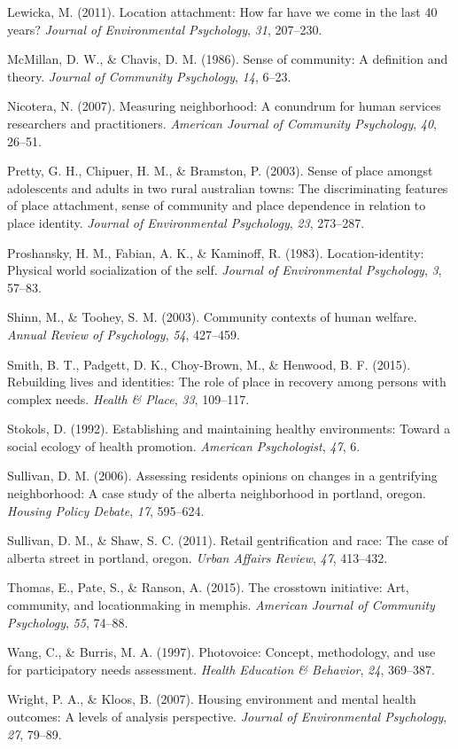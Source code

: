 \documentclass[11pt,]{tufte-handout}
\begin{document}
\hypertarget{ref-lewicka2011place}{}
Lewicka, M. (2011). Location attachment: How far have we come in the
last 40 years? \emph{Journal of Environmental Psychology}, \emph{31},
207--230.

\hypertarget{ref-mcmillan1986sense}{}
McMillan, D. W., \& Chavis, D. M. (1986). Sense of community: A
definition and theory. \emph{Journal of Community Psychology},
\emph{14}, 6--23.

\hypertarget{ref-nicotera2007measuring}{}
Nicotera, N. (2007). Measuring neighborhood: A conundrum for human
services researchers and practitioners. \emph{American Journal of
Community Psychology}, \emph{40}, 26--51.

\hypertarget{ref-pretty2003sense}{}
Pretty, G. H., Chipuer, H. M., \& Bramston, P. (2003). Sense of place
amongst adolescents and adults in two rural australian towns: The
discriminating features of place attachment, sense of community and
place dependence in relation to place identity. \emph{Journal of
Environmental Psychology}, \emph{23}, 273--287.

\hypertarget{ref-proshansky1983place}{}
Proshansky, H. M., Fabian, A. K., \& Kaminoff, R. (1983).
Location-identity: Physical world socialization of the self.
\emph{Journal of Environmental Psychology}, \emph{3}, 57--83.

\hypertarget{ref-shinn2003community}{}
Shinn, M., \& Toohey, S. M. (2003). Community contexts of human welfare.
\emph{Annual Review of Psychology}, \emph{54}, 427--459.

\hypertarget{ref-smith2015rebuilding}{}
Smith, B. T., Padgett, D. K., Choy-Brown, M., \& Henwood, B. F. (2015).
Rebuilding lives and identities: The role of place in recovery among
persons with complex needs. \emph{Health \& Place}, \emph{33}, 109--117.

\hypertarget{ref-stokols1992establishing}{}
Stokols, D. (1992). Establishing and maintaining healthy environments:
Toward a social ecology of health promotion. \emph{American
Psychologist}, \emph{47}, 6.

\hypertarget{ref-sullivan2006assessing}{}
Sullivan, D. M. (2006). Assessing residents opinions on changes in a
gentrifying neighborhood: A case study of the alberta neighborhood in
portland, oregon. \emph{Housing Policy Debate}, \emph{17}, 595--624.

\hypertarget{ref-sullivan2011retail}{}
Sullivan, D. M., \& Shaw, S. C. (2011). Retail gentrification and race:
The case of alberta street in portland, oregon. \emph{Urban Affairs
Review}, \emph{47}, 413--432.

\hypertarget{ref-thomas2015crosstown}{}
Thomas, E., Pate, S., \& Ranson, A. (2015). The crosstown initiative:
Art, community, and locationmaking in memphis. \emph{American Journal of
Community Psychology}, \emph{55}, 74--88.

\hypertarget{ref-wang1997photovoice}{}
Wang, C., \& Burris, M. A. (1997). Photovoice: Concept, methodology, and
use for participatory needs assessment. \emph{Health Education \&
Behavior}, \emph{24}, 369--387.

\hypertarget{ref-wright2007housing}{}
Wright, P. A., \& Kloos, B. (2007). Housing environment and mental
health outcomes: A levels of analysis perspective. \emph{Journal of
Environmental Psychology}, \emph{27}, 79--89.
\end{document}
